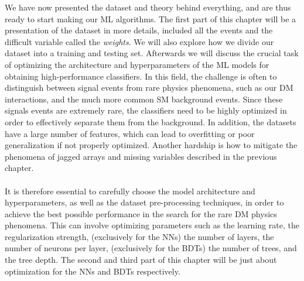 \documentclass[12pt, a4paper]{book}
\begin{document}
\label{chap:Method_ML}
We have now presented the dataset and theory behind everything, and are thus ready to start making our ML algorithms. The first part of this chapter will be a presentation of the dataset in more details, included all the events and the difficult variable called the \textit{weights}.
We will also explore how we divide our dataset into a training and testing set. Afterwards we will discuss the crucial task of optimizing the architecture and hyperparameters of the ML models for obtaining high-performance classifiers. In this field, the challenge is often to 
distinguish between signal events from rare physics phenomena, such as our DM interactions, and the much more common SM background events. Since these signals events are extremely rare, the classifiers need to be highly optimized in order to effectively separate them from 
the background. In addition, the datasets have a large number of features, which can lead to overfitting or poor generalization if not properly optimized. Another hardship is how to mitigate the phenomena of jagged arrays and missing variables described in the previous chapter.\\
\\It is therefore essential to carefully choose the model architecture and hyperparameters, as well as the dataset pre-processing techniques, in order to achieve the best possible performance in the search for the rare DM physics phenomena. This can involve optimizing 
parameters such as the learning rate, the regularization strength, (exclusively for the NNs) the number of layers, the number of neurons per layer, (exclusively for the BDTs) the number of trees, and the tree depth. The second and third part of this chapter will be just about optimization for the NNs and BDTs respectively.

\clearpage
\end{document}
